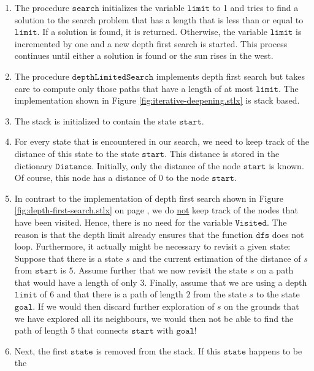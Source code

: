 \begin{enumerate}
\item The procedure $\mathtt{search}$ initializes the variable $\mathtt{limit}$ to 1 and tries to find a solution
      to the search problem that has a length that is less than or equal to $\mathtt{limit}$.  If a solution is
      found, it is returned.  Otherwise, the variable $\mathtt{limit}$ is incremented by one and a new depth
      first search is started.  This process continues until either a solution is found or the sun rises in the
      west. 
\item The procedure $\mathtt{depthLimitedSearch}$ implements depth first search but takes care to compute only
      those paths that have a length of at most $\mathtt{limit}$.  The implementation shown in Figure
      \ref{fig:iterative-deepening.stlx} is stack based.
\item The stack is initialized to contain the state $\mathtt{start}$.
\item For every state that is encountered in our search, we need to keep track of the distance of this state to
      the state $\mathtt{start}$.  This distance is stored in the dictionary $\mathtt{Distance}$.  Initially,
      only the distance of the node $\mathtt{start}$ is known.  Of course, this node has a distance of $0$ to
      the node $\mathtt{start}$.
\item In contrast to the implementation of depth first search shown in Figure \ref{fig:depth-first-search.stlx}
      on page \pageref{fig:depth-first-search.stlx}, we do \underline{not} keep track of the nodes that have
      been visited.  Hence, there is no need for the variable $\mathtt{Visited}$.  The reason is that the depth
      limit already ensures that the function $\mathtt{dfs}$ does not loop.  Furthermore, it actually might be necessary to
      revisit a given state:  Suppose that there is a state $s$ and the current estimation of the distance of
      $s$ from $\mathtt{start}$ is $5$.  Assume further that we now revisit the state $s$ on a path that would have
      a length of only $3$.  Finally, assume that we are using a depth $\mathtt{limit}$ of $6$ and that there
      is a path of length $2$ from the state $s$ to the state $\mathtt{goal}$.  If we would then discard
      further exploration of $s$ on the grounds that we have explored all its neighbours, we would then not be
      able to find the path of length $5$ that connects $\mathtt{start}$ with $\mathtt{goal}$!
\item Next, the first $\mathtt{state}$ is removed from the stack.  If this $\mathtt{state}$ happens to be the

\end{enumerate}

